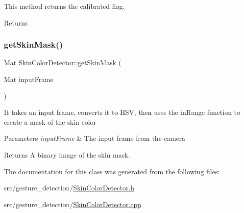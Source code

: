 This method returns the calibrated flag. \begin{DoxyReturn}{Returns}

\end{DoxyReturn}
\mbox{\label{classSkinColorDetector_a8cf2f51c4c7797a126b767e48458a006}} 
\subsubsection{\texorpdfstring{get\+Skin\+Mask()}{getSkinMask()}}
{\footnotesize\ttfamily Mat Skin\+Color\+Detector\+::get\+Skin\+Mask (\begin{DoxyParamCaption}\item[{Mat}]{input\+Frame }\end{DoxyParamCaption})}

It takes an input frame, converts it to H\+SV, then uses the in\+Range function to create a mask of the skin color


\begin{DoxyParams}{Parameters}
{\em input\+Frame} & The input frame from the camera\\
\hline
\end{DoxyParams}
\begin{DoxyReturn}{Returns}
A binary image of the skin mask. 
\end{DoxyReturn}


The documentation for this class was generated from the following files\+:\begin{DoxyCompactItemize}
\item 
src/gesture\+\_\+detection/\hyperlink{SkinColorDetector_8h}{Skin\+Color\+Detector.\+h}\item 
src/gesture\+\_\+detection/\hyperlink{SkinColorDetector_8cpp}{Skin\+Color\+Detector.\+cpp}\end{DoxyCompactItemize}
